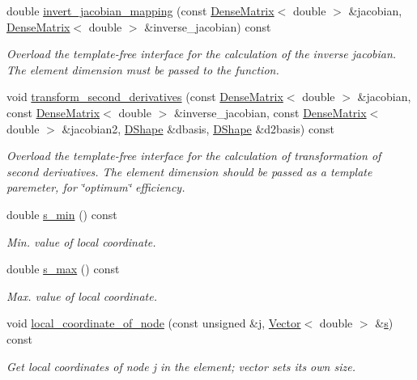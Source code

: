 \begin{DoxyCompactItemize}
double \hyperlink{classoomph_1_1QHermiteElement_a1b5cb1c9b780010ae16a5107d811ce03}{invert\+\_\+jacobian\+\_\+mapping} (const \hyperlink{classoomph_1_1DenseMatrix}{Dense\+Matrix}$<$ double $>$ \&jacobian, \hyperlink{classoomph_1_1DenseMatrix}{Dense\+Matrix}$<$ double $>$ \&inverse\+\_\+jacobian) const
\begin{DoxyCompactList}\small\item\em Overload the template-\/free interface for the calculation of the inverse jacobian. The element dimension must be passed to the function. \end{DoxyCompactList}\item 
void \hyperlink{classoomph_1_1QHermiteElement_a0f000889085286deef3b273043522834}{transform\+\_\+second\+\_\+derivatives} (const \hyperlink{classoomph_1_1DenseMatrix}{Dense\+Matrix}$<$ double $>$ \&jacobian, const \hyperlink{classoomph_1_1DenseMatrix}{Dense\+Matrix}$<$ double $>$ \&inverse\+\_\+jacobian, const \hyperlink{classoomph_1_1DenseMatrix}{Dense\+Matrix}$<$ double $>$ \&jacobian2, \hyperlink{classoomph_1_1DShape}{D\+Shape} \&dbasis, \hyperlink{classoomph_1_1DShape}{D\+Shape} \&d2basis) const
\begin{DoxyCompactList}\small\item\em Overload the template-\/free interface for the calculation of transformation of second derivatives. The element dimension should be passed as a template paremeter, for \char`\"{}optimum\char`\"{} efficiency. \end{DoxyCompactList}\item 
double \hyperlink{classoomph_1_1QHermiteElement_a913af787533d6c0fae4269c601ac62af}{s\+\_\+min} () const
\begin{DoxyCompactList}\small\item\em Min. value of local coordinate. \end{DoxyCompactList}\item 
double \hyperlink{classoomph_1_1QHermiteElement_a9f603f92a0aae12188dcb6bcf105b8b9}{s\+\_\+max} () const
\begin{DoxyCompactList}\small\item\em Max. value of local coordinate. \end{DoxyCompactList}\item 
void \hyperlink{classoomph_1_1QHermiteElement_a40d6a579987b39c4427f88745de83c89}{local\+\_\+coordinate\+\_\+of\+\_\+node} (const unsigned \&j, \hyperlink{classoomph_1_1Vector}{Vector}$<$ double $>$ \&\hyperlink{cfortran_8h_ab7123126e4885ef647dd9c6e3807a21c}{s}) const
\begin{DoxyCompactList}\small\item\em Get local coordinates of node j in the element; vector sets its own size. \end{DoxyCompactList}\item 

\end{DoxyCompactItemize}
